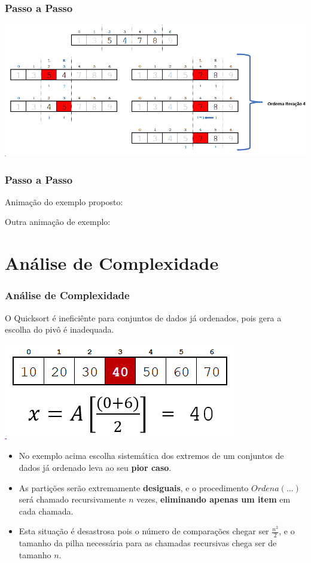 \documentclass[
	11pt, %
]{beamer}
\begin{document}
\begin{frame}
	\frametitle{Passo a Passo}
	\includegraphics[width=0.9\linewidth]{o4}
\end{frame}
\begin{frame}
	\frametitle{Passo a Passo}
	\justifying
	
	Animação do exemplo proposto:
	
	\begin{center}
	\end{center}

	Outra animação de exemplo:
	\begin{center}
	\end{center}

\end{frame}

\section{Análise de Complexidade} 
\begin{frame}
	\frametitle{Análise de Complexidade}
	\justifying
	O Quicksort é ineficiênte para conjuntos de dados já ordenados, pois gera a escolha do pivô é inadequada.
	\begin{center}
		\includegraphics[width=0.5\linewidth]{exemplo1}
	\end{center}
	{\tiny
	\begin{itemize}
		\item \justifying No exemplo acima escolha sistemática dos extremos de um conjuntos de dados já ordenado leva ao seu \textbf{pior caso}.
	
		\item \justifying As partições serão extremamente \textbf{desiguais}, e o procedimento $Ordena(...)$ será chamado recursivamente $n$ vezes, \textbf{eliminando apenas um item} em cada chamada.
		
		\item \justifying Esta situação é desastrosa pois o número de comparações chegar ser $\frac{n^{2}}{2}$, e o tamanho da pilha necessária para as chamadas recursivas chega ser de tamanho $n$.
	\end{itemize}
	}
\end{frame}
\end{document}
